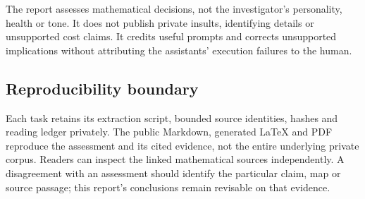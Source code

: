 \documentclass[
  british,
  11pt,
  a4paper,
]{article}
\begin{document}
The report assesses mathematical decisions, not the investigator's
personality, health or tone. It does not publish private insults,
identifying details or unsupported cost claims. It credits useful
prompts and corrects unsupported implications without attributing the
assistants' execution failures to the human.

\subsection{Reproducibility boundary}\label{reproducibility-boundary}

Each task retains its extraction script, bounded source identities,
hashes and reading ledger privately. The public Markdown, generated
LaTeX and PDF reproduce the assessment and its cited evidence, not the
entire underlying private corpus. Readers can inspect the linked
mathematical sources independently. A disagreement with an assessment
should identify the particular claim, map or source passage; this
report's conclusions remain revisable on that evidence.
\end{document}
